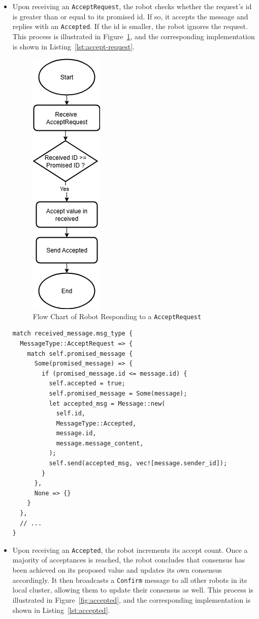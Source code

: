 \documentclass[12pt,a4paper]{article}
\begin{document}
\begin{itemize}
\item Upon receiving an \texttt{AcceptRequest}, the robot checks whether the request’s id is greater than or equal to its promised id. If so, it accepts the message and replies with an \texttt{Accepted}. If the id is smaller, the robot ignores the request. This process is illustrated in Figure~\ref{fig:accept-request}, and the corresponding implementation is shown in Listing~\ref{lst:accept-request}.

\begin{figure}
    \centering
    \includegraphics[width=0.2\linewidth]{images/accept_request.png}
    \caption{Flow Chart of Robot Responding to a \texttt{AcceptRequest}}   
    \label{fig:accept-request}
\end{figure}

\begin{lstlisting}[float, caption={Robot Receives a \texttt{AcceptRequest}}, label={lst:accept-request}]
match received_message.msg_type {
  MessageType::AcceptRequest => {
    match self.promised_message {
      Some(promised_message) => {
        if (promised_message.id <= message.id) {
          self.accepted = true;
          self.promised_message = Some(message);
          let accepted_msg = Message::new(
            self.id,
            MessageType::Accepted,
            message.id,
            message.message_content,
          );
          self.send(accepted_msg, vec![message.sender_id]);
        }
      },
      None => {}
    }
  },
  // ...
}
\end{lstlisting}

\item Upon receiving an \texttt{Accepted}, the robot increments its accept count. Once a majority of acceptances is reached, the robot concludes that consensus has been achieved on its proposed value and updates its own consensus accordingly. It then broadcasts a \texttt{Confirm} message to all other robots in its local cluster, allowing them to update their consensus as well. This process is illustrated in Figure~\ref{fig:accepted}, and the corresponding implementation is shown in Listing~\ref{lst:accepted}.


\end{itemize}
\end{document}
